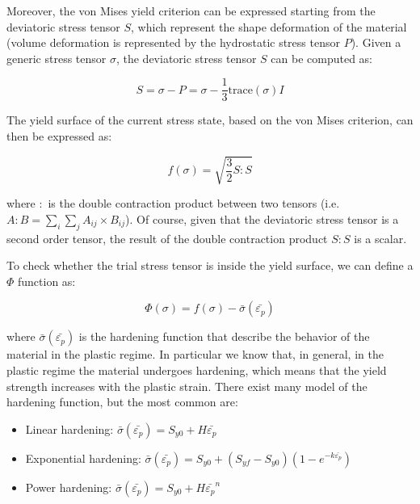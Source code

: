 Moreover, the von Mises yield criterion can be expressed starting from the deviatoric stress tensor $S$, which represent the shape deformation of the material (volume deformation is represented by the hydrostatic stress tensor $P$).
Given a generic stress tensor $\sigma$, the deviatoric stress tensor $S$ can be computed as:

\begin{equation}
    S = \sigma - P = \sigma - \frac{1}{3} \text{trace}(\sigma) I
\end{equation}

The yield surface of the current stress state, based on the von Mises criterion, can then be expressed as:

\begin{equation}
    f(\sigma) = \sqrt{\frac{3}{2} S : S}
    \label{eq:yield_surface}
\end{equation}

where $:$ is the double contraction product between two tensors (i.e. $A : B = \sum_{i}\sum_{j} A_{ij} \times B_{ij}$).
Of course, given that the deviatoric stress tensor is a second order tensor, the result of the double contraction product $S : S$ is a scalar.

To check whether the trial stress tensor is inside the yield surface, we can define a $\Phi$ function as:

\begin{equation}
    \Phi(\sigma) = f(\sigma) - \bar{\sigma}(\bar{\varepsilon_p})
\end{equation}

where $\bar{\sigma}(\bar{\varepsilon_p})$ is the hardening function that describe the behavior of the material in the plastic regime.
In particular we know that, in general, in the plastic regime the material undergoes hardening, which means that the yield strength increases with the plastic strain.
There exist many model of the hardening function, but the most common are:

\begin{itemize}
    \item Linear hardening: $\bar{\sigma}(\bar{\varepsilon_p}) = S_{y0} + H \bar{\varepsilon_p}$
    \item Exponential hardening: $\bar{\sigma}(\bar{\varepsilon_p}) = S_{y0} + (S_{yf} - S_{y0}) (1 - e^{-k \bar{\varepsilon_p}})$
    \item Power hardening: $\bar{\sigma}(\bar{\varepsilon_p}) = S_{y0} + H \bar{\varepsilon_p}^n$
\end{itemize}

